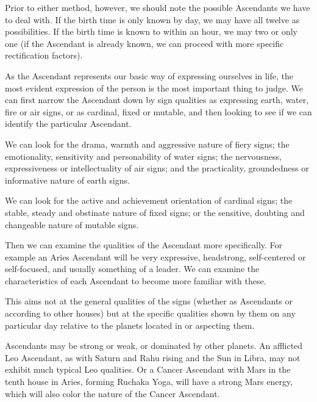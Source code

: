  

Prior to either method, however, we should note the possible Ascendants we have to deal with. If the birth time is only known by day, we may have all twelve as possibilities. If the birth time is known to within an hour, we may two or only one (if the Ascendant is already known, we can proceed with more specific rectification factors).

 


 

As the Ascendant represents our basic way of expressing ourselves in life, the most evident expression of the person is the most important thing to judge. We can first narrow the Ascendant down by sign qualities as expressing earth, water, fire or air signs, or as cardinal, fixed or mutable, and then looking to see if we can identify the particular Ascendant.

 

We can look for the drama, warmth and aggressive nature of fiery signs; the emotionality, sensitivity and personability of water signs; the nervousness, expressiveness or intellectuality of air signs; and the practicality, groundedness or informative nature of earth signs.

 

We can look for the active and achievement orientation of cardinal signs; the stable, steady and obstinate nature of fixed signs; or the sensitive, doubting and changeable nature of mutable signs.

 

Then we can examine the qualities of the Ascendant more specifically. For example an Aries Ascendant will be very expressive, headstrong, self-centered or self-focused, and usually something of a leader. We can examine the characteristics of each Ascendant to become more familiar with these.

 


 

This aims not at the general qualities of the signs (whether as Ascendants or according to other houses) but at the specific qualities shown by them on any particular day relative to the planets located in or aspecting them.

 

Ascendants may be strong or weak, or dominated by other planets. An afflicted Leo Ascendant, as with Saturn and Rahu rising and the Sun in Libra, may not exhibit much typical Leo qualities. Or a Cancer Ascendant with Mars in the tenth house in Aries, forming Ruchaka Yoga, will have a strong Mars energy, which will also color the nature of the Cancer Ascendant.

